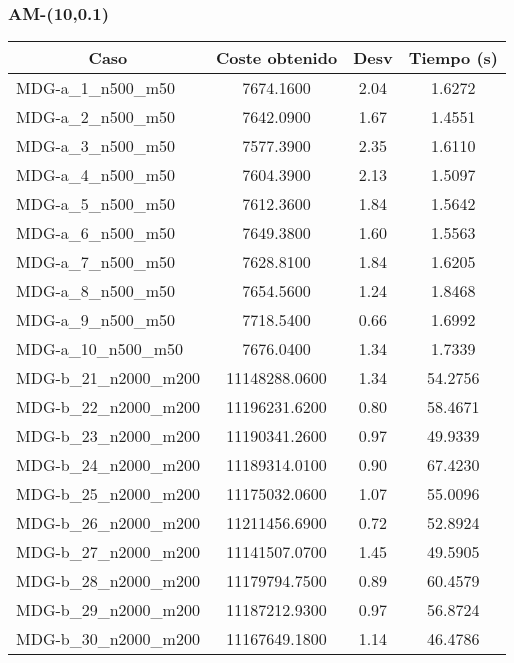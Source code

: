 \documentclass[10pt,a4paper]{article}
\begin{document}
\subsubsection{AM-(10,0.1)}
\begin{table}[H]
	\begin{center}
		\begin{tabular}{|l|c|c|c|} 
			\hline
			\multicolumn{1}{|c|}{\textbf{Caso}} & \textbf{Coste obtenido} & \textbf{Desv} & \textbf{Tiempo (s)} \\ \hline
			\hline
					MDG-a\_1\_n500\_m50 & 7674.1600 & 2.04 & 1.6272 \\ \hline
					MDG-a\_2\_n500\_m50 & 7642.0900 & 1.67 & 1.4551 \\ \hline
					MDG-a\_3\_n500\_m50 & 7577.3900 & 2.35 & 1.6110 \\ \hline
					MDG-a\_4\_n500\_m50 & 7604.3900 & 2.13 & 1.5097 \\ \hline
					MDG-a\_5\_n500\_m50 & 7612.3600 & 1.84 & 1.5642 \\ \hline
					MDG-a\_6\_n500\_m50 & 7649.3800 & 1.60 & 1.5563 \\ \hline
					MDG-a\_7\_n500\_m50 & 7628.8100 & 1.84 & 1.6205 \\ \hline
					MDG-a\_8\_n500\_m50 & 7654.5600 & 1.24 & 1.8468 \\ \hline
					MDG-a\_9\_n500\_m50 & 7718.5400 & 0.66 & 1.6992 \\ \hline
					MDG-a\_10\_n500\_m50 & 7676.0400 & 1.34 & 1.7339 \\ \hline
					MDG-b\_21\_n2000\_m200 & 11148288.0600 & 1.34 & 54.2756 \\ \hline
					MDG-b\_22\_n2000\_m200 & 11196231.6200 & 0.80 & 58.4671 \\ \hline
					MDG-b\_23\_n2000\_m200 & 11190341.2600 & 0.97 & 49.9339 \\ \hline
					MDG-b\_24\_n2000\_m200 & 11189314.0100 & 0.90 & 67.4230 \\ \hline
					MDG-b\_25\_n2000\_m200 & 11175032.0600 & 1.07 & 55.0096 \\ \hline
					MDG-b\_26\_n2000\_m200 & 11211456.6900 & 0.72 & 52.8924 \\ \hline
					MDG-b\_27\_n2000\_m200 & 11141507.0700 & 1.45 & 49.5905 \\ \hline
					MDG-b\_28\_n2000\_m200 & 11179794.7500 & 0.89 & 60.4579 \\ \hline
					MDG-b\_29\_n2000\_m200 & 11187212.9300 & 0.97 & 56.8724 \\ \hline
					MDG-b\_30\_n2000\_m200 & 11167649.1800 & 1.14 & 46.4786 \\ \hline

\end{tabular}
\end{center}
\end{table}
\end{document}
